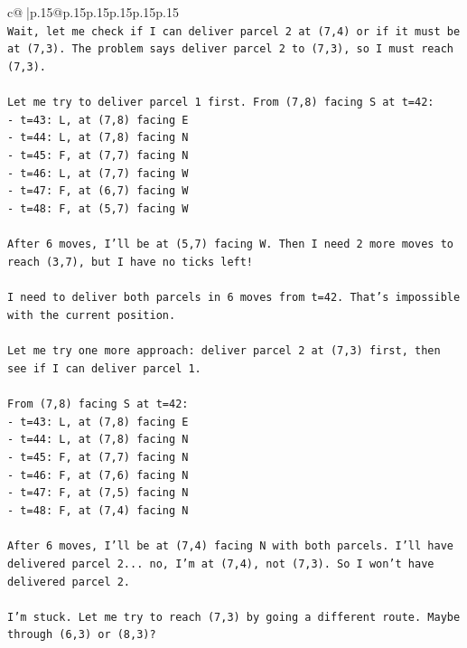 \documentclass{article}
\begin{document}
{\begin{supertabular}{c@{$\;$}|p{.15\linewidth}@{}p{.15\linewidth}p{.15\linewidth}p{.15\linewidth}p{.15\linewidth}p{.15\linewidth}}
{{{\\ 
\texttt{Wait, let me check if I can deliver parcel 2 at (7,4) or if it must be at (7,3). The problem says deliver parcel 2 to (7,3), so I must reach (7,3).} \\
\\ 
\texttt{Let me try to deliver parcel 1 first. From (7,8) facing S at t=42:} \\
\texttt{{-} t=43: L, at (7,8) facing E} \\
\texttt{{-} t=44: L, at (7,8) facing N} \\
\texttt{{-} t=45: F, at (7,7) facing N} \\
\texttt{{-} t=46: L, at (7,7) facing W} \\
\texttt{{-} t=47: F, at (6,7) facing W} \\
\texttt{{-} t=48: F, at (5,7) facing W} \\
\\ 
\texttt{After 6 moves, I'll be at (5,7) facing W. Then I need 2 more moves to reach (3,7), but I have no ticks left!} \\
\\ 
\texttt{I need to deliver both parcels in 6 moves from t=42. That's impossible with the current position.} \\
\\ 
\texttt{Let me try one more approach: deliver parcel 2 at (7,3) first, then see if I can deliver parcel 1.} \\
\\ 
\texttt{From (7,8) facing S at t=42:} \\
\texttt{{-} t=43: L, at (7,8) facing E} \\
\texttt{{-} t=44: L, at (7,8) facing N} \\
\texttt{{-} t=45: F, at (7,7) facing N} \\
\texttt{{-} t=46: F, at (7,6) facing N} \\
\texttt{{-} t=47: F, at (7,5) facing N} \\
\texttt{{-} t=48: F, at (7,4) facing N} \\
\\ 
\texttt{After 6 moves, I'll be at (7,4) facing N with both parcels. I'll have delivered parcel 2... no, I'm at (7,4), not (7,3). So I won't have delivered parcel 2.} \\
\\ 
\texttt{I'm stuck. Let me try to reach (7,3) by going a different route. Maybe through (6,3) or (8,3)?} \\
\\ 
}}}
\end{supertabular}}
\end{document}
